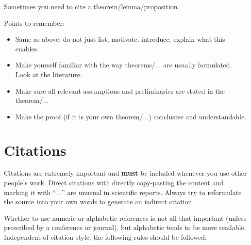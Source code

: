 Sometimes you need to cite a theorem/lemma/proposition. 

Points to remember:
\begin{itemize}
	\item Same as above: do not just list, motivate, introduce, explain what this enables.
	\item Make yourself familiar with the way theorems/... are usually formulated. Look at the literature. 
	\item Make sure all relevant assumptions and preliminaries are stated in the theorem/...
	\item Make the proof (if it is your own theorem/...) conclusive and understandable.
\end{itemize}



\section{Citations}

Citations are extremely important and \textbf{must} be included whenever you use other people's work. Direct citations with directly copy-pasting the content and marking it with ``$\ldots$'' are unusual in scientific reports. Always try to reformulate the source into your own words to generate an indirect citation. 


Whether to use numeric or alphabetic references is not all that important (unless prescribed by a conference or journal), but alphabetic tends to be more readable. Independent of citation style, the following rules should be followed:

